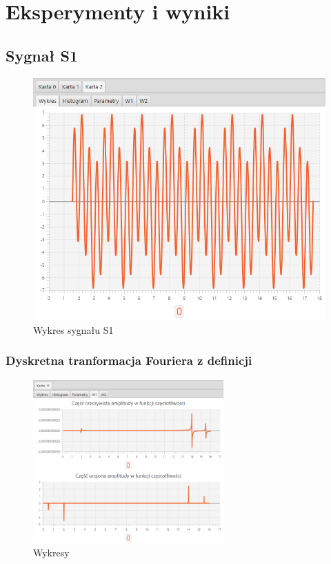 \documentclass[12pt]{article}
\begin{document}
    \section{Eksperymenty i wyniki} {

        \subsection{Sygnał S1} {

            \begin{figure}[H]
                \centering
                \includegraphics[width=\textwidth]{img/result/s1/data_134333.png}
                \caption{Wykres sygnału S1}
            \end{figure}
            \newpage

            \subsubsection{Dyskretna tranformacja Fouriera z definicji} {

                \begin{figure}[H]
                    \centering
                    \includegraphics[width=0.65\textwidth]{img/result/s1/01/W1_draw_1_sinus_sampling_trans_s1_data_205616.png}
                    \caption{Wykresy}
                \end{figure}

}}}
\end{document}
